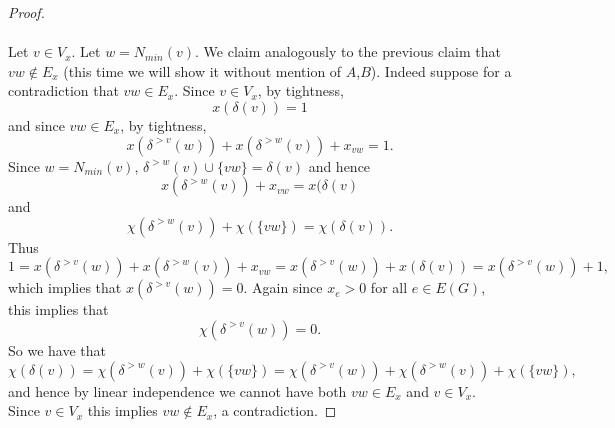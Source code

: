 \begin{proof}
\paragraph{}
Let $v \in V_x$. Let $w = N_{min}(v)$. We claim analogously to the previous claim that $vw \not\in E_x$ (this time we will show it without mention of $A$,$B$). Indeed suppose for a contradiction that $vw  \in E_x$. Since $v \in V_x$, by tightness,
$$x(\delta(v)) = 1$$
and since $vw \in E_x$, by tightness,
$$x(\delta^{>v}(w)) + x(\delta^{>w}(v)) + x_{vw} = 1.$$
Since $w = N_{min}(v)$, $\delta^{>w}(v) \cup \{vw\} = \delta(v)$ and hence
$$x(\delta^{>w}(v)) + x_{vw} = x(\delta(v)$$
and
$$\chi(\delta^{>w}(v)) + \chi(\{vw\}) = \chi(\delta(v)).$$
Thus
$$1 = x(\delta^{>v}(w)) + x(\delta^{>w}(v)) + x_{vw} = x(\delta^{>v}(w)) + x(\delta(v)) = x(\delta^{>v}(w)) + 1,$$
which implies that $x(\delta^{>v}(w)) = 0$. Again since $x_e > 0$ for all $e \in E(G)$, this implies that
$$\chi(\delta^{>v}(w)) = 0.$$
So we have that
$$\chi(\delta(v)) = \chi(\delta^{>w}(v)) + \chi(\{vw\}) = \chi(\delta^{>v}(w)) + \chi(\delta^{>w}(v)) + \chi(\{vw\}),$$
and hence by linear independence we cannot have both $vw \in E_x$ and $v \in V_x$. Since $v \in V_x$ this implies $vw \not\in E_x$, a contradiction.
\end{proof}